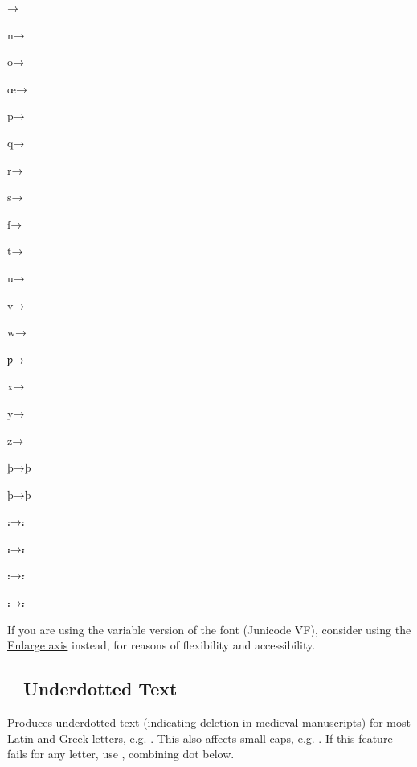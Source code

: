 \begin{multicols}{6}
\hfill→\hfill{}

n\hfill→\hfill{}

o\hfill→\hfill{}

œ\hfill→\hfill{}

p\hfill→\hfill{}

q\hfill→\hfill{}

r\hfill→\hfill{}

s\hfill→\hfill{}

ſ\hfill→\hfill{}

t\hfill→\hfill{}

u\hfill→\hfill{}

v\hfill→\hfill{}

w\hfill→\hfill{}

ƿ\hfill→\hfill{}

x\hfill→\hfill{}

y\hfill→\hfill{}

z\hfill→\hfill{}

{þ\hfill→\hfill\EnlargedMinuscules{}þ}

{þ\hfill→\hfill\EnlargedMinuscules{}þ}

{⹎\hfill→\hfill\EnlargedMinuscules⹎}

{⹎\hfill→\hfill\EnlargedMinuscules{}⹎}

{⹎\hfill→\hfill\EnlargedMinuscules{}⹎}

{⹎\hfill→\hfill\EnlargedMinuscules{}⹎}
\end{multicols}

\noindent If you are using the variable version of the font (Junicode VF), consider using the
\hyperlink{enlarge}{Enlarge axis}
instead, for reasons of flexibility and accessibility.

\subsection{ – Underdotted Text}
Produces underdotted text (indicating deletion in medieval manuscripts) for most
Latin and Greek letters, e.g.
. This also affects small
caps, e.g. .
If this feature fails for any letter, use , combining dot below.

